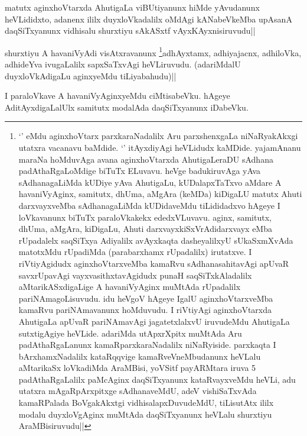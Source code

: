 
\begin{artha}
matutx aginxhoVtarxda AhutigaLa viBUtiyanunx hiMde yAvudanunx 
heVLididxto, adanenx ililx duyxloVkadalilx oMdAgi kANabeVkeMba upAsanA 
daqSiTxyanunx vidhisalu shurxtiyu sAkASxtf vAyxKAyxnisiruvudu||
\end{artha}

\begin{artha}
shurxtiyu A havaniVyAdi visAtxravanunx \footnote[1]{`\stext' eMdu 
aginxhoVtarx parxkaraNadalilx Aru parxshenxgaLa niNaRyakAkxgi utatxra 
vacanavu baMdide. `\stext' itAyxdiyAgi heVLidudx kaMDide. yajamAnanu 
maraNa hoMduvAga avana aginxhoVtarxda AhutigaLeraDU sAdhana 
padAthaRgaLoMdige biTuTx ELuvavu. heVge badukiruvAga yAva 
sAdhanagaLiMda kUDiye yAva AhutigaLu, kUDalapxTaTxvo aMdare A 
havaniVyAginx, samitutx, dhUma, aMgAra (keMDa) kiDigaLU matutx Ahuti 
darxvayxveMba sAdhanagaLiMda kUDidaveMdu tiLididadxvo hAgeye I 
loVkavanunx biTuTx paraloVkakekx ededxVLuvavu. aginx, samitutx, dhUma, 
aMgAra, kiDigaLu, Ahuti darxvayxkiSxVrAdidarxvayx eMba rUpadalelx 
saqSiTxya Adiyalilx avAyxkaqta dasheyalilxyU sUkaSxmXvAda matotxMdu 
rUpadiMda (parabarxhamx rUpadalilx) irutatxve. I riVtiyAgidudx 
aginxhoVtarxveMba kamaRvu sAdhanasahitavAgi apUvaR savxrUpavAgi 
vayxvasithxtavAgidudx punaH saqSiTxkAladalilx aMtarikASxdigaLige A 
havaniVyAginx muMtAda rUpadalilx pariNAmagoLisuvudu. idu heVgoV hAgeye 
IgalU aginxhoVtarxveMba kamaRvu pariNAmavanunx hoMduvudu. I riVtiyAgi 
aginxhoVtarxda AhutigaLa apUvaR pariNAmavAgi jagatetxlalxvU iruvudeMdu 
AhutigaLa sutxtigAgiye heVLide. adariMda utApxrXpitx muMtAda Aru 
padAthaRgaLanunx kamaRparxkaraNadalilx niNaRyiside. parxkaqta I 
bArxhamxNadalilx kataRqqvige kamaRveVneMbudanunx heVLalu aMtarikaSx 
loVkadiMda AraMBisi, yoVSitf payARMtara iruva 5 padAthaRgaLalilx 
paMcAginx daqSiTxyanunx kataRvayxveMdu heVLi, adu utatxra 
mAgaRpArxpitxge sAdhanaveMdU, adeV vishiSaTxvAda kamaRPalada 
BoVgakAkxtgi vidhisalapxDuvudeMdU, tiLisutAtx ililx modalu 
duyxloVgAginx muMtAda daqSiTxyanunx heVLalu shurxtiyu AraMBisiruvudu||}adhAyxtamx, 
adhiyajacnx, adhiloVka, adhideYva ivugaLalilx sapxSaTxvAgi 
heVLiruvudu. (adariMdalU duyxloVkAdigaLu aginxyeMdu tiLiyabahudu)||
\end{artha}

\begin{artha}
I paraloVkave A havaniVyAginxyeMdu ciMtisabeVku. hAgeye 
AditAyxdigaLalUlx samitutx modalAda daqSiTxyanunx iDabeVku.
\end{artha}

